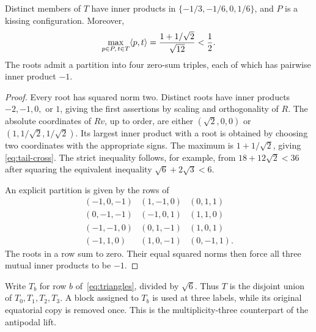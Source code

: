 \begin{lemma}\label{lem:tails}
Distinct members of $T$ have inner products in
$\{-1/3,-1/6,0,1/6\}$, and $P$ is a kissing configuration. Moreover,
\begin{equation}\label{eq:tail-cross}
 \max_{p\in P,\,t\in T}\langle p,t\rangle
  =\frac{1+1/\sqrt2}{\sqrt{12}}<\frac12.
\end{equation}
The roots admit a partition into four zero-sum triples, each of which
has pairwise inner product $-1$.
\end{lemma}
\begin{proof}
Every root has squared norm two. Distinct roots have inner products
$-2,-1,0,$ or $1$, giving the first assertions by scaling and
orthogonality of $R$. The absolute coordinates of $Rv$, up to order,
are either $(\sqrt2,0,0)$ or $(1,1/\sqrt2,1/\sqrt2)$. Its largest inner
product with a root is obtained by choosing two coordinates with the
appropriate signs. The maximum is $1+1/\sqrt2$, giving
\eqref{eq:tail-cross}. The strict inequality follows, for example, from
$18+12\sqrt2<36$ after squaring the equivalent inequality
$\sqrt6+2\sqrt3<6$.

An explicit partition is given by the rows of
\begin{equation}\label{eq:triangles}
\begin{array}{rrr}
 (-1,0,-1)&(1,-1,0)&(0,1,1)\\
 (0,-1,-1)&(-1,0,1)&(1,1,0)\\
 (-1,-1,0)&(0,1,-1)&(1,0,1)\\
 (-1,1,0)&(1,0,-1)&(0,-1,1).
\end{array}
\end{equation}
The roots in a row sum to zero. Their equal squared norms then force
all three mutual inner products to be $-1$.
\end{proof}

Write $T_b$ for row $b$ of~\eqref{eq:triangles}, divided by $\sqrt6$.
Thus $T$ is the disjoint union of $T_0,T_1,T_2,T_3$. A block assigned
to $T_b$ is used at three labels, while its original equatorial copy
is removed once. This is the multiplicity-three counterpart of the
antipodal lift.

